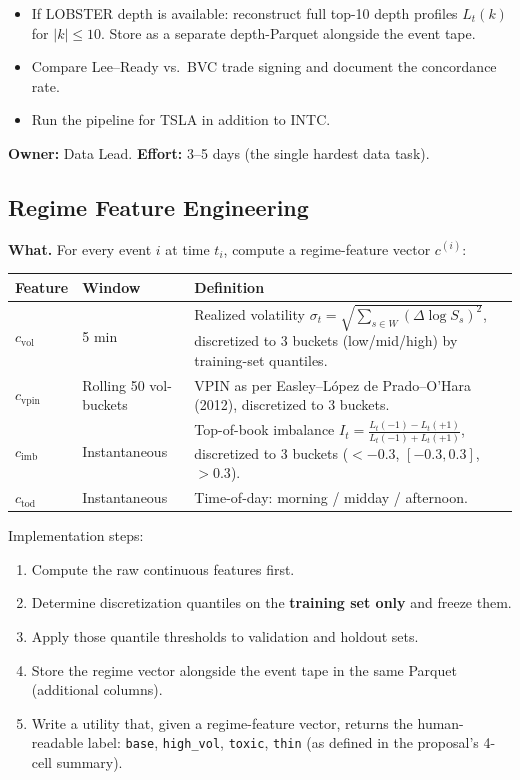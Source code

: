\documentclass[11pt,a4paper]{article}
\begin{document}
\begin{deepbox}
  \begin{itemize}[nosep]
    \item If LOBSTER depth is available: reconstruct full top-10 depth profiles $L_t(k)$ for $|k| \leq 10$.  Store as a separate depth-Parquet alongside the event tape.
    \item Compare Lee--Ready vs.\ BVC trade signing and document the concordance rate.
    \item Run the pipeline for TSLA in addition to INTC.
  \end{itemize}
\end{deepbox}

\textbf{Owner:} Data Lead. \quad \textbf{Effort:} 3--5 days (the single hardest data task).

\subsection{Regime Feature Engineering}

\textbf{What.}
For every event $i$ at time $t_i$, compute a regime-feature vector $c^{(i)}$:

\begin{center}
\begin{tabular}{llp{7cm}}
\toprule
\textbf{Feature} & \textbf{Window} & \textbf{Definition} \\
\midrule
$c_{\text{vol}}$ & 5 min & Realized volatility $\sigma_t = \sqrt{\sum_{s \in W}(\Delta \log S_s)^2}$, discretized to 3 buckets (low/mid/high) by training-set quantiles. \\
$c_{\text{vpin}}$ & Rolling 50 vol-buckets & VPIN as per Easley--L\'opez de Prado--O'Hara (2012), discretized to 3 buckets. \\
$c_{\text{imb}}$ & Instantaneous & Top-of-book imbalance $I_t = \frac{L_t(-1) - L_t(+1)}{L_t(-1) + L_t(+1)}$, discretized to 3 buckets ($< -0.3$, $[-0.3,0.3]$, $> 0.3$). \\
$c_{\text{tod}}$ & Instantaneous & Time-of-day: morning / midday / afternoon. \\
\bottomrule
\end{tabular}
\end{center}

Implementation steps:
\begin{enumerate}[nosep]
  \item Compute the raw continuous features first.
  \item Determine discretization quantiles on the \textbf{training set only} and freeze them.
  \item Apply those quantile thresholds to validation and holdout sets.
  \item Store the regime vector alongside the event tape in the same Parquet (additional columns).
  \item Write a utility that, given a regime-feature vector, returns the human-readable label: \texttt{base}, \texttt{high\_vol}, \texttt{toxic}, \texttt{thin} (as defined in the proposal's 4-cell summary).
\end{enumerate}
\end{document}
